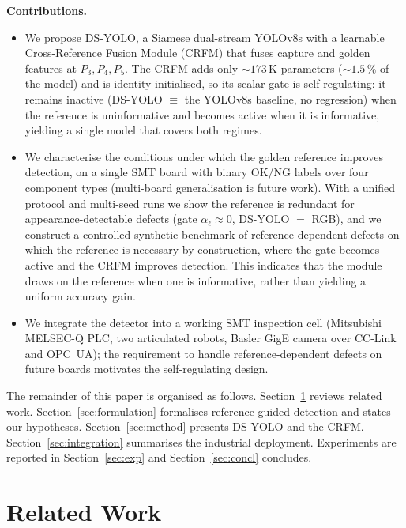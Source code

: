 \documentclass[conference]{IEEEtran}
\begin{document}
\medskip
\noindent\textbf{Contributions.}
\begin{itemize}
    \item We propose DS-YOLO, a Siamese dual-stream YOLOv8s with a learnable
    Cross-Reference Fusion Module (CRFM) that fuses capture and golden features
    at $P_3,P_4,P_5$. The CRFM adds only $\sim\!173\,$K parameters
    ($\sim\!1.5\,\%$ of the model) and is identity-initialised, so its scalar
    gate is self-regulating: it remains inactive (DS-YOLO $\equiv$ the YOLOv8s
    baseline, no regression) when the reference is uninformative and becomes
    active when it is informative, yielding a single model that covers both
    regimes.
    \item We characterise the conditions under which the golden reference improves
    detection, on a single SMT board with binary OK/NG labels over four component
    types (multi-board generalisation is future work). With a unified protocol and
    multi-seed runs we show the reference is redundant for appearance-detectable
    defects (gate $\alpha_\ell\!\approx\!0$, DS-YOLO $=$ RGB), and we construct a
    controlled synthetic benchmark of reference-dependent defects on which the
    reference is necessary by construction, where the gate becomes active and the
    CRFM improves detection. This indicates that the module draws on the reference when
    one is informative, rather than yielding a uniform accuracy gain.
    \item We integrate the detector into a working SMT inspection cell
    (Mitsubishi MELSEC-Q PLC, two articulated robots, Basler GigE camera over
    CC-Link and OPC~UA); the requirement to handle reference-dependent defects on
    future boards motivates the self-regulating design.
\end{itemize}

The remainder of this paper is organised as follows.
Section~\ref{sec:related} reviews related work.
Section~\ref{sec:formulation} formalises reference-guided detection and
states our hypotheses. Section~\ref{sec:method} presents DS-YOLO and the CRFM.
Section~\ref{sec:integration} summarises the industrial deployment.
Experiments are reported in Section~\ref{sec:exp} and
Section~\ref{sec:concl} concludes.

\section{Related Work}
\label{sec:related}
\end{document}
